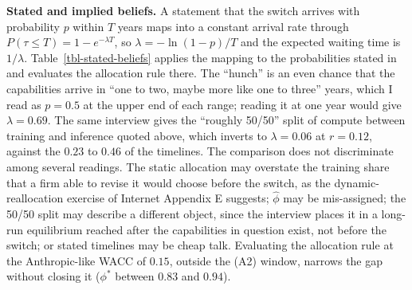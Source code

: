 \documentclass[
  11pt,
  letterpaper,
]{scrartcl}
\begin{document}
\textbf{Stated and implied beliefs.} A statement that the switch arrives
with probability \(p\) within \(T\) years maps into a constant arrival
rate through \(P(\tau \leq T) = 1 - e^{-\lambda T}\), so
\(\lambda = -\ln(1-p)/T\) and the expected waiting time is
\(1/\lambda\). Table~\ref{tbl-stated-beliefs} applies the mapping to the
probabilities stated in \citet{amodei2026dwarkesh} and evaluates the
allocation rule there. The ``hunch'' is an even chance that the
capabilities arrive in ``one to two, maybe more like one to three''
years, which I read as \(p = 0.5\) at the upper end of each range;
reading it at one year would give \(\lambda = 0.69\). The same interview
gives the ``roughly 50/50'' split of compute between training and
inference quoted above, which inverts to \(\lambda = 0.06\) at
\(r = 0.12\), against the \(0.23\) to \(0.46\) of the timelines. The
comparison does not discriminate among several readings. The static
allocation may overstate the training share that a firm able to revise
it would choose before the switch, as the dynamic-reallocation exercise
of Internet Appendix E suggests; \(\hat{\phi}\) may be mis-assigned; the
50/50 split may describe a different object, since the interview places
it in a long-run equilibrium reached after the capabilities in question
exist, not before the switch; or stated timelines may be cheap talk.
Evaluating the allocation rule at the Anthropic-like WACC of \(0.15\),
outside the (A2) window, narrows the gap without closing it (\(\phi^*\)
between \(0.83\) and \(0.94\)).
\end{document}
